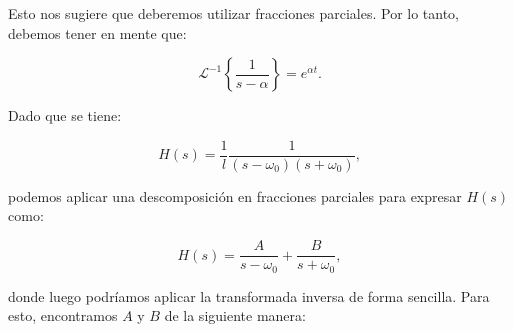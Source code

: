 \documentclass[
  11pt,
  letterpaper,
   addpoints,
   answers
  ]{exam}
\begin{document}
\begin{questions}
\begin{solution}
Esto nos sugiere que deberemos utilizar fracciones parciales. Por lo tanto, debemos tener en mente que:

\begin{equation}
\mathcal{L}^{-1}\left\{ \frac{1}{s - \alpha} \right\} = e^{\alpha t}.
\end{equation}

Dado que se tiene:

\begin{equation}
H(s) = \frac{1}{l} \frac{1}{(s - \omega_0)(s + \omega_0)},
\end{equation}

podemos aplicar una descomposición en fracciones parciales para expresar \(H(s)\) como:

\begin{equation}
H(s) = \frac{A}{s - \omega_0} + \frac{B}{s + \omega_0},
\end{equation}

donde luego podríamos aplicar la transformada inversa de forma sencilla. Para esto, encontramos \(A\) y \(B\) de la siguiente manera:


\end{solution}
\end{questions}
\end{document}
